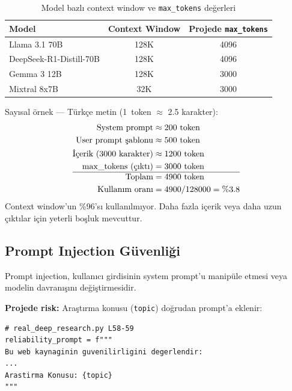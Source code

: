 \begin{table}[H]
\centering
\caption{Model bazl{\i} context window ve \texttt{max\_tokens} de\u{g}erleri}
\label{tab:context-windows}
\begin{tabular}{lcc}
\toprule
\color{chapterBlue}\textbf{Model} &
\color{chapterBlue}\textbf{Context Window} &
\color{chapterBlue}\textbf{Projede \texttt{max\_tokens}} \\
\midrule
Llama 3.1 70B & 128K & 4096 \\
DeepSeek-R1-Distill-70B & 128K & 4096 \\
Gemma 3 12B & 128K & 3000 \\
Mixtral 8x7B & 32K & 3000 \\
\bottomrule
\end{tabular}
\end{table}

\begin{ornek}
Say{\i}sal \"{o}rnek --- T\"{u}rk\c{c}e metin (1~token $\approx$ 2.5 karakter):
\begin{align*}
\text{System prompt} &\approx 200 \text{ token} \\
\text{User prompt \c{s}ablonu} &\approx 500 \text{ token} \\
\text{\.{I}\c{c}erik (3000 karakter)} &\approx 1200 \text{ token} \\
\text{max\_tokens (\c{c}{\i}kt{\i})} &= 3000 \text{ token} \\
\hline
\text{Toplam} &= 4900 \text{ token} \\
\text{Kullan{\i}m oran{\i}} &= 4900 / 128000 = \%3.8
\end{align*}
Context window'un \%96's{\i} kullan{\i}lm{\i}yor. Daha fazla i\c{c}erik veya daha uzun \c{c}{\i}kt{\i}lar i\c{c}in yeterli bo\c{s}luk mevcuttur.
\end{ornek}


\subsection{Prompt Injection G\"{u}venli\u{g}i}
\label{sec:prompt-injection}

Prompt injection, kullan{\i}c{\i} girdisinin system prompt'u manip\"{u}le etmesi veya modelin davran{\i}\c{s}{\i}n{\i} de\u{g}i\c{s}tirmesidir.

\textbf{Projede risk:} Ara\c{s}t{\i}rma konusu (\texttt{topic}) do\u{g}rudan prompt'a eklenir:

\begin{lstlisting}
# real_deep_research.py L58-59
reliability_prompt = f"""
Bu web kaynaginin guvenilirligini degerlendir:
...
Arastirma Konusu: {topic}
"""
\end{lstlisting}

